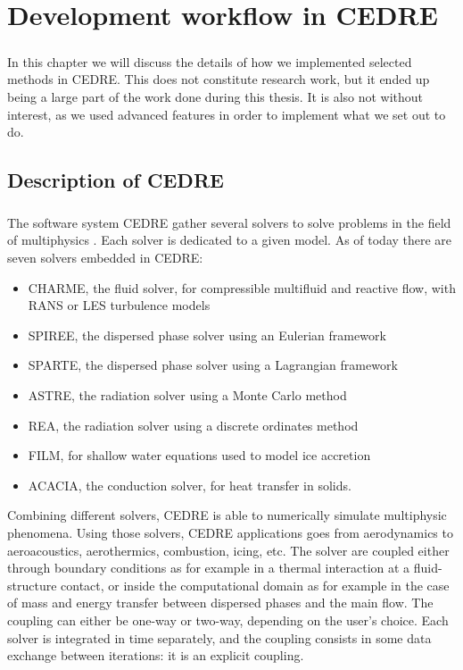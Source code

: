 \chapter{Development workflow in CEDRE}

  \paragraph{}
  In this chapter we will discuss the details of how we implemented selected methods in CEDRE.
  This does not constitute research work, but it ended up being a large part of the work done during this thesis.
  It is also not without interest, as we used advanced features in order to implement what we set out to do.


  \section{Description of CEDRE}

    \paragraph{}
    The software system CEDRE gather several solvers to solve problems in the field of multiphysics \cite{ReflochCourbetMurroneEtAl2011}.
    Each solver is dedicated to a given model.
    As of today there are seven solvers embedded in CEDRE:
    \begin{itemize}
      \item CHARME, the fluid solver, for compressible multifluid and reactive flow, with RANS or LES turbulence models
      \item SPIREE, the dispersed phase solver using an Eulerian framework
      \item SPARTE, the dispersed phase solver using a Lagrangian framework
      \item ASTRE, the radiation solver using a Monte Carlo method
      \item REA, the radiation solver using a discrete ordinates method
      \item FILM, for shallow water equations used to model ice accretion
      \item ACACIA, the conduction solver, for heat transfer in solids.
    \end{itemize}
    Combining different solvers, CEDRE is able to numerically simulate multiphysic phenomena.
    Using those solvers, CEDRE applications goes from aerodynamics to aeroacoustics, aerothermics, combustion, icing, etc.
    The solver are coupled either through boundary conditions as for example in a thermal interaction at a fluid-structure contact, or inside the computational domain as for example in the case of mass and energy transfer between dispersed phases and the main flow.
    The coupling can either be one-way or two-way, depending on the user's choice.
    Each solver is integrated in time separately, and the coupling consists in some data exchange between iterations: it is an explicit coupling.


